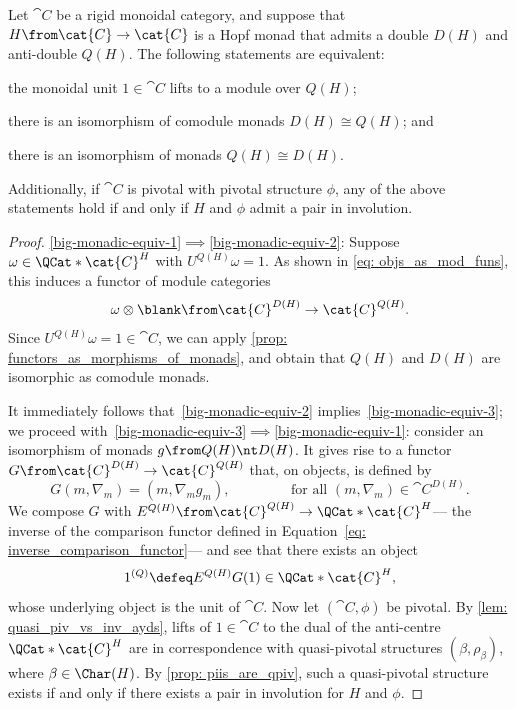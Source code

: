 \begin{theorem}\label{thm: equivalence_in_the_monad_setting}
  Let \(\cat{C}\) be a rigid monoidal category,
  and suppose that \(H \from \cat{C} \to \cat{C}\) is a Hopf monad
  that admits a double \(D(H)\) and anti\hyp{}double \(Q(H)\).
  The following statements are equivalent:
  \begin{thmlist}[noitemsep]
    \item\label{big-monadic-equiv-1} the monoidal unit \(1 \in \cat{C}\) lifts to a module over \(Q(H)\);
    \item\label{big-monadic-equiv-2} there is an isomorphism of comodule monads \(D(H) \cong Q(H)\); and
    \item\label{big-monadic-equiv-3} there is an isomorphism of monads \(Q(H) \cong D(H)\).
  \end{thmlist}
  Additionally, if \(\cat{C}\) is pivotal with pivotal structure \(\phi\),
  any of the above statements hold if and only if \(H\) and \(\phi\) admit a pair in involution.
\end{theorem}
\begin{proof}\ref{big-monadic-equiv-1}\(\implies\)\ref{big-monadic-equiv-2}:
  Suppose \(\omega \in \QCat*{\cat{C}^H}\) with \(U^{Q(H)}\omega = 1\).
  As shown in \cref{eq: objs_as_mod_funs},
  this induces a functor of module categories
  \[
    \omega \otimes \blank  \from \cat{C}^{D(H)} \to \cat{C}^{Q(H)}.
  \]
  Since \(U^{Q(H)}\omega = 1 \in \cat{C}\),
  we can apply \cref{prop: functors_as_morphisms_of_monads},
  and obtain that \(Q(H)\) and \(D(H)\) are isomorphic as comodule monads.

  It immediately follows that~\ref{big-monadic-equiv-2} implies~\ref{big-monadic-equiv-3};
  we proceed with~\ref{big-monadic-equiv-3}\(\implies\)\ref{big-monadic-equiv-1}:
  consider an isomorphism of monads \(g \from Q(H) \nt D(H)\).
  It gives rise to a functor \(G \from \cat{C}^{D(H)} \to \cat{C}^{Q(H)}\) that, on objects, is defined by
  \[
    G(m, \nabla_m) = (m, \nabla_m g_m), \qquad \qquad \text{ for all } (m, \nabla_m) \in \cat{C}^{D(H)}.
  \]
  We compose \(G\) with \(E^{Q(H)} \from \cat{C}^{Q(H)} \to \QCat*{\cat{C}^H}\)—%
  the inverse of the comparison functor defined in Equation~\eqref{eq: inverse_comparison_functor}—%
  and see that there exists an object
  \[
    1^{(Q)} \defeq E^{Q(H)}G(1) \in \QCat*{\cat{C}^H},
  \]
  whose underlying object is the unit of \(\cat{C}\).
  Now let \((\cat{C}, \phi)\) be pivotal.
  By \cref{lem: quasi_piv_vs_inv_ayds}, lifts of \(1\in \cat{C}\) to the dual of
  the anti\hyp{}centre \(\QCat*{\cat{C}^H}\)
  are in correspondence with quasi-pivotal structures
  \((\beta, \rho_{\beta})\), where \(\beta \in \Char(H)\).
  By \cref{prop: piis_are_qpiv}, such a quasi-pivotal structure exists if and only if
  there exists a pair in involution for \(H\) and \(\phi\).
\end{proof}

